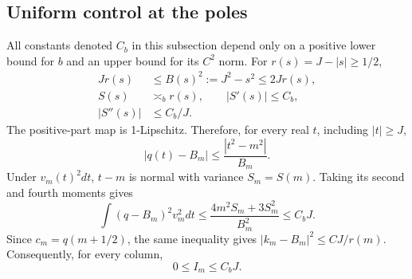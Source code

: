 \documentclass[aps,pra,reprint,superscriptaddress]{revtex4-2}
\theoremstyle{remark}
\begin{document}
\subsection{Uniform control at the poles}

All constants denoted $C_b$ in this subsection depend only on a
positive lower bound for $b$ and an upper bound for its $C^2$ norm.
For $r(s)=J-|s|\geq1/2$,
\begin{equation}
\begin{aligned}
Jr(s)&\leq B(s)^2:=J^2-s^2\leq2Jr(s),\\
S(s)&\asymp_b r(s),\qquad |S'(s)|\leq C_b,\\
|S''(s)|&\leq C_b/J.
\end{aligned}
\label{eq:pole-scales}
\end{equation}
The positive-part map is 1-Lipschitz. Therefore, for every real $t$,
including $|t|\geq J$,
\begin{equation}
 |q(t)-B_m|\leq\frac{|t^2-m^2|}{B_m}.
 \label{eq:global-q}
\end{equation}
Under $v_m(t)^2dt$, $t-m$ is normal with variance $S_m=S(m)$.
Taking its second and fourth moments gives
\begin{equation}
 \int(q-B_m)^2v_m^2dt
 \leq\frac{4m^2S_m+3S_m^2}{B_m^2}\leq C_bJ.
 \label{eq:position-bound}
\end{equation}
Since $c_m=q(m+1/2)$, the same inequality gives
$|k_m-B_m|^2\leq CJ/r(m)$. Consequently, for every column,
\begin{equation}
 0\leq I_m\leq C_bJ.
 \label{eq:I-bound}
\end{equation}
\end{document}
